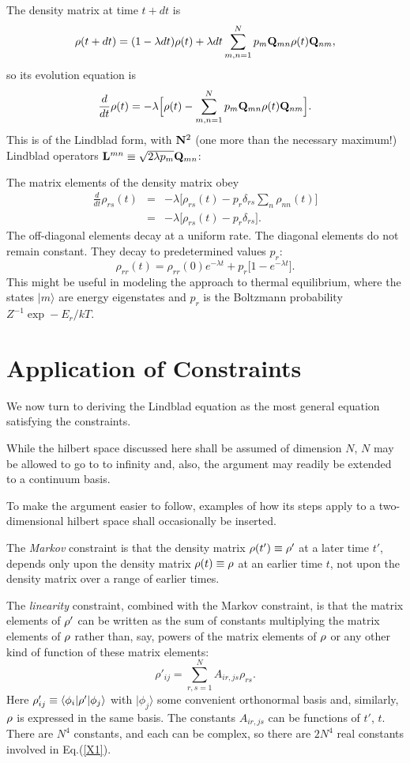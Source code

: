 \documentclass[aps,pra,amssymb, amsfonts,amsmath,showpacs, superscriptaddress,12pt]{revtex4}
\begin{document}
The density matrix at time $t+dt$ is
\[
{\bf \rho}(t+dt)=(1-\lambda dt){\bf \rho}(t)+\lambda dt\sum_{m,n=1}^{N}p_{m}{\bf Q}_{mn} {\bf \rho}(t){\bf Q}_{nm}, 
\]
\noindent so its evolution equation is 
\[
\frac{d}{dt}{\bf \rho}(t)=-\lambda\Big[{\bf \rho}(t)-\sum_{m,n=1}^{N}p_{m}{\bf Q}_{mn} {\bf \rho}(t){\bf Q}_{nm}\Big].
\]
\noindent This is of the Lindblad form, with ${\bf N}^{2}$ (one more than the necessary maximum!) Lindblad operators 
${\bf L}^{mn}\equiv\sqrt{2\lambda p_{m}}{\bf Q}_{mn}$: 

The matrix elements of the density matrix obey
\begin{eqnarray}
\frac{d}{dt} \rho_{rs}(t)&=&-\lambda\Big[ \rho_{rs}(t)-p_{r}\delta_{rs}\sum_{n}\rho_{nn}(t)\Big]\nonumber\\
&=&-\lambda\Big[ \rho_{rs}(t)-p_{r}\delta_{rs}\Big].\nonumber
\end{eqnarray}
\noindent The off-diagonal elements decay at a uniform rate.  The diagonal elements do not remain constant. They decay to predetermined values $p_{r}$:
\[
\rho_{rr}(t)=\rho_{rr}(0)e^{-\lambda t}+p_{r}\Big[1-e^{-\lambda t}\Big].
\]
This might be useful in modeling the  approach to thermal equilibrium, where the states $|m\rangle$ are energy eigenstates and $p_{r}$ is the Boltzmann probability $Z^{-1}\exp-E_{r}/kT$.
 

  \section{Application of Constraints} 
 
 We now turn to deriving the Lindblad equation as the most general equation satisfying the constraints.  
 
 While the hilbert space discussed here shall 
 be assumed of dimension $N$,  $N$ may be allowed to go to to infinity and, also, the argument may readily be extended to a continuum basis. 
 
To make the argument  
easier to follow,  examples of how its steps apply to a two-dimensional hilbert space shall occasionally be inserted.  
 
 The  \textit{Markov} constraint is that the density matrix ${\bf\rho}(t')\equiv{\bf\rho}'$ at a later time $t'$,  depends only upon the density matrix ${\bf\rho}(t)\equiv{\bf\rho}$ at an earlier time $t$,  not upon the density matrix over a range of earlier times. 
 
The \textit{linearity} constraint, combined with the Markov constraint, is that the matrix elements of ${\bf\rho}'$ can be written as the sum of constants multiplying the matrix elements of ${\bf\rho}$  rather than, say, powers of the matrix elements of ${\bf\rho}$ or any other kind of function of these matrix elements: 
 \begin{equation}\label{X1}
\rho'_{ij}=\sum_{r,s=1}^{N}A_{ir,js}\rho_{rs}.  
\end{equation}
\noindent  Here $\rho'_{ij}\equiv\langle\phi_{i}|{\bf\rho}' |\phi_{j}\rangle$  with $ |\phi_{j}\rangle$  some convenient orthonormal basis and,  similarly, ${\bf\rho}$ is expressed in the same basis.  The constants $A_{ir,js}$ can be functions of $t'$, $t$. There are $N^{4}$ constants, and each can be complex, so there are $2N^{4}$ real constants involved 
in Eq.(\ref{X1}). 
\end{document}
